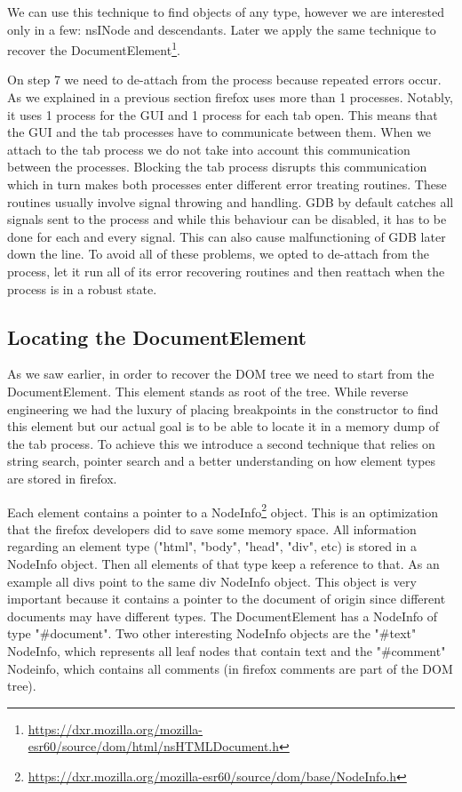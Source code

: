 We can use this technique to find objects of any type, however we are interested only in a few: nsINode and descendants. Later we apply the same technique to recover the DocumentElement\footnote{\url{https://dxr.mozilla.org/mozilla-esr60/source/dom/html/nsHTMLDocument.h}}.

On step 7 we need to de-attach from the process because repeated errors occur. As we explained in a previous section firefox uses more than 1 processes. Notably, it uses 1 process for the GUI and 1 process for each tab open. This means that the GUI and the tab processes have to communicate between them. When we attach to the tab process we do not take into account this communication between the processes. Blocking the tab process disrupts this communication which in turn makes both processes enter different error treating routines. These routines usually involve signal throwing and handling. GDB by default catches all signals sent to the process and while this behaviour can be disabled, it has to be done for each and every signal. This can also cause malfunctioning of GDB later down the line. To avoid all of these problems, we opted to de-attach from the process, let it run all of its error recovering routines and then reattach when the process is in a robust state.

\subsection{Locating the DocumentElement}
As we saw earlier, in order to recover the DOM tree we need to start from the DocumentElement. This element stands as root of the tree. While reverse engineering we had the luxury of placing breakpoints in the constructor to find this element but our actual goal is to be able to locate it in a memory dump of the tab process. To achieve this we introduce a second technique that relies on string search, pointer search and a better understanding on how element types are stored in firefox.

Each element contains a pointer to a NodeInfo\footnote{\url{https://dxr.mozilla.org/mozilla-esr60/source/dom/base/NodeInfo.h}} object. This is an optimization that the firefox developers did to save some memory space. All information regarding an element type ("html", "body", "head", "div", etc) is stored in a NodeInfo object. Then all elements of that type keep a reference to that. As an example all divs point to the same div NodeInfo object. This object is very important because it contains a pointer to the document of origin since different documents may have different types. The DocumentElement has a NodeInfo of type "\#document". Two other interesting NodeInfo objects are the "\#text" NodeInfo, which represents all leaf nodes that contain text and the "\#comment" Nodeinfo, which contains all comments (in firefox comments are part of the DOM tree).

